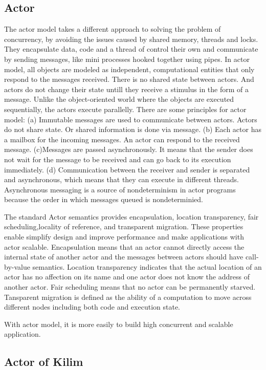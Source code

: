 \documentclass[twocolumn,a4paper,10pt]{article}
\begin{document}
\subsection{Actor}
The actor model takes a different approach to solving the problem of concurrency, by avoiding the issues caused by shared memory, threads and locks. They encapsulate data, code and a thread of control their own and communicate by sending messages, like mini processes hooked together using pipes. In actor model, all objects are modeled as independent, computational entities that only respond to the messages received. There is no shared state between actors. And actors do not change their state untill they receive a stimulus in the form of a message. Unlike the object-oriented world where the objects are executed sequentially, the actors execute parallelly. There are some principles for actor model: (a) Immutable messages are used to communicate between actors. Actors do not share state. Or shared information is done via message. (b) Each actor has a mailbox for the incoming messages. An actor can respond to the received message. (c)Messages are passed asynchronously. It means that the sender does not wait for the message to be received and can go back to its execution immediately. (d) Communication between the receiver and sender is separated and asynchronous, which means that they can execute in different threads. Asynchronous messaging is a source of nondeterminism in actor programs because the order in which messages queued is nondeterminied.

The standard Actor semantics provides encapsulation, location transparency, fair scheduling,locality of reference, and transparent migration. These properties enable simplify design and improve performance and make applications with actor scalable.  Encapsulation means that an actor cannot directly access the internal state of another actor and the messages between actors should have call-by-value semantics. Location transparency indicates that the actual location of an actor has no affection on its name and one actor does not know the address of another actor. Fair scheduling means that no actor can be permanently starved. Tansparent migration is defined as the ability of a computation to move across different nodes including both code and execution state.

With actor model, it is more easily to build high concurrent and scalable application.\newline

\subsection{Actor of Kilim}
\end{document}
